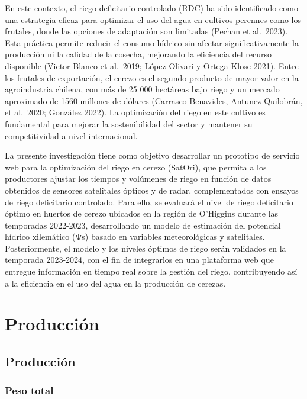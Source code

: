 \documentclass[
  letterpaper,
  DIV=11,
  numbers=noendperiod]{scrreprt}
\begin{document}
En este contexto, el riego deficitario controlado (RDC) ha sido
identificado como una estrategia eficaz para optimizar el uso del agua
en cultivos perennes como los frutales, donde las opciones de adaptación
son limitadas (Pechan et al.~2023). Esta práctica permite reducir el
consumo hídrico sin afectar significativamente la producción ni la
calidad de la cosecha, mejorando la eficiencia del recurso disponible
(Victor Blanco et al.~2019; López-Olivari y Ortega-Klose 2021). Entre
los frutales de exportación, el cerezo es el segundo producto de mayor
valor en la agroindustria chilena, con más de 25 000 hectáreas bajo
riego y un mercado aproximado de 1560 millones de dólares
(Carrasco-Benavides, Antunez-Quilobrán, et al.~2020; González 2022). La
optimización del riego en este cultivo es fundamental para mejorar la
sostenibilidad del sector y mantener su competitividad a nivel
internacional.

La presente investigación tiene como objetivo desarrollar un prototipo
de servicio web para la optimización del riego en cerezo (SatOri), que
permita a los productores ajustar los tiempos y volúmenes de riego en
función de datos obtenidos de sensores satelitales ópticos y de radar,
complementados con ensayos de riego deficitario controlado. Para ello,
se evaluará el nivel de riego deficitario óptimo en huertos de cerezo
ubicados en la región de O'Higgins durante las temporadas 2022-2023,
desarrollando un modelo de estimación del potencial hídrico xilemático
(Ψs) basado en variables meteorológicas y satelitales. Posteriormente,
el modelo y los niveles óptimos de riego serán validados en la temporada
2023-2024, con el fin de integrarlos en una plataforma web que entregue
información en tiempo real sobre la gestión del riego, contribuyendo así
a la eficiencia en el uso del agua en la producción de cerezas.

\part{Producción}

\chapter{Producción}\label{producciuxf3n-1}

\section{Peso total}\label{peso-total}
\end{document}
